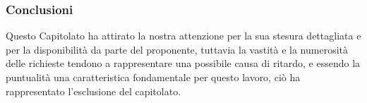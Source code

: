 \subsubsection{Conclusioni}
Questo Capitolato ha attirato la nostra attenzione per la sua stesura dettagliata e per la disponibilità da parte del proponente, tuttavia la vastità e la numerosità delle richieste tendono a rappresentare una possibile causa di ritardo, e essendo la puntualità una caratteristica fondamentale per questo lavoro, ciò ha rappresentato l'esclusione del capitolato.
